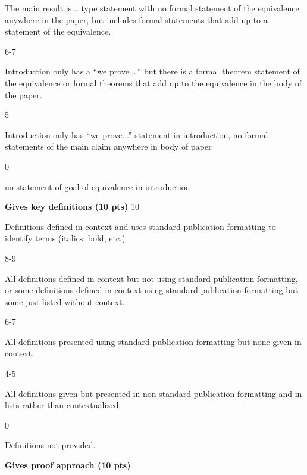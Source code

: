 \documentclass{article}
\begin{document}
    The main result is...
    type statement with no formal statement of the equivalence anywhere
    in the paper, but includes formal statements that add up to a
    statement of the equivalence.
    \par\hfill\par
    6-7
    \par
    Introduction only has a ``we prove....'' but there is a formal theorem
    statement of the equivalence or formal theorems that add up to the
    equivalence in the body of the paper.
    \par\hfill\par
    5
    \par
    Introduction only has ``we prove...'' statement in introduction,
    no formal statements of the main claim anywhere in body of paper
    \par\hfill\par
    0
    \par
    no statement of goal of equivalence in introduction
    \par\hfill\par
    \textbf{Gives key definitions (10 pts)}
    10
    \par
    Definitions defined in context and uses standard publication
    formatting to identify terms (italics, bold, etc.)
    \par\hfill\par
    8-9
    \par
    All definitions defined in context but not using standard
    publication formatting, or some definitions defined in context
    using standard publication formatting but some just listed without context.
    \par\hfill\par
    6-7
    \par
    All definitions presented using standard publication formatting
    but none given in context.
    \par\hfill\par
    4-5
    \par
    All definitions given but presented in non-standard publication
    formatting and in lists rather than contextualized.
    \par\hfill\par
    0
    \par
    Definitions not provided.
    \par\hfill\par
    \textbf{Gives proof approach (10 pts)}
    \par\hfill\par
\end{document}
